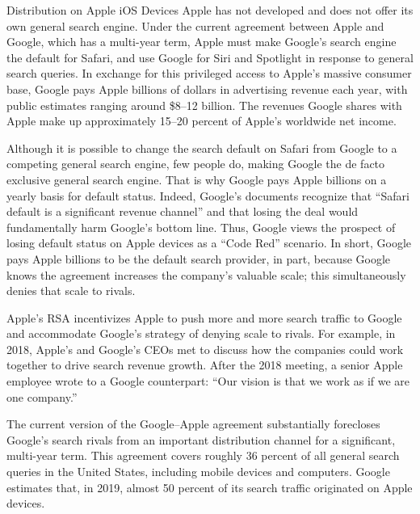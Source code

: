 \documentclass[11pt,b5paper]{scrartcl}
\begin{document}



Distribution on Apple iOS Devices
Apple has not developed and does not offer its own general search engine. Under
the current agreement between Apple and Google, which has a multi-year term, Apple must
make Google’s search engine the default for Safari, and use Google for Siri and Spotlight in
response to general search queries. In exchange for this privileged access to Apple’s massive
consumer base, Google pays Apple billions of dollars in advertising revenue each year, with
public estimates ranging around \$8–12 billion. The revenues Google shares with Apple make up
approximately 15–20 percent of Apple’s worldwide net income.


Although it is possible to change the search default on Safari from Google to a
competing general search engine, few people do, making Google the de facto exclusive general
search engine. That is why Google pays Apple billions on a yearly basis for default status.
Indeed, Google’s documents recognize that “Safari default is a significant revenue channel” and
that losing the deal would fundamentally harm Google’s bottom line. Thus, Google views the
prospect of losing default status on Apple devices as a “Code Red” scenario. In short, Google
pays Apple billions to be the default search provider, in part, because Google knows the
agreement increases the company’s valuable scale; this simultaneously denies that scale to rivals.


Apple’s RSA incentivizes Apple to push more and more search traffic to Google
and accommodate Google’s strategy of denying scale to rivals. For example, in 2018, Apple’s
and Google’s CEOs met to discuss how the companies could work together to drive search
revenue growth. After the 2018 meeting, a senior Apple employee wrote to a Google
counterpart: “Our vision is that we work as if we are one company.”


The current version of the Google–Apple agreement substantially forecloses
Google’s search rivals from an important distribution channel for a significant, multi-year term.
This agreement covers roughly 36 percent of all general search queries in the United States,
including mobile devices and computers. Google estimates that, in 2019, almost 50 percent of its
search traffic originated on Apple devices.
\end{document}
